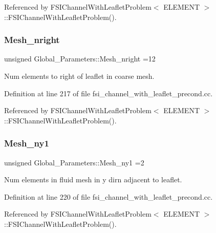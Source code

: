 Referenced by F\+S\+I\+Channel\+With\+Leaflet\+Problem$<$ E\+L\+E\+M\+E\+N\+T $>$\+::\+F\+S\+I\+Channel\+With\+Leaflet\+Problem().

\mbox{\label{namespaceGlobal__Parameters_a83ca6bb6240a3f5ef2199a8646607dcf}} 
\subsubsection{\texorpdfstring{Mesh\+\_\+nright}{Mesh\_nright}}
{\footnotesize\ttfamily unsigned Global\+\_\+\+Parameters\+::\+Mesh\+\_\+nright =12}



Num elements to right of leaflet in coarse mesh. 



Definition at line 217 of file fsi\+\_\+channel\+\_\+with\+\_\+leaflet\+\_\+precond.\+cc.



Referenced by F\+S\+I\+Channel\+With\+Leaflet\+Problem$<$ E\+L\+E\+M\+E\+N\+T $>$\+::\+F\+S\+I\+Channel\+With\+Leaflet\+Problem().

\mbox{\label{namespaceGlobal__Parameters_a77f2f492d44897203cceb4cbadef7aba}} 
\subsubsection{\texorpdfstring{Mesh\+\_\+ny1}{Mesh\_ny1}}
{\footnotesize\ttfamily unsigned Global\+\_\+\+Parameters\+::\+Mesh\+\_\+ny1 =2}



Num elements in fluid mesh in y dirn adjacent to leaflet. 



Definition at line 220 of file fsi\+\_\+channel\+\_\+with\+\_\+leaflet\+\_\+precond.\+cc.



Referenced by F\+S\+I\+Channel\+With\+Leaflet\+Problem$<$ E\+L\+E\+M\+E\+N\+T $>$\+::\+F\+S\+I\+Channel\+With\+Leaflet\+Problem().

\mbox{\label{namespaceGlobal__Parameters_ab0c1b5c0070b43a56ef64b106b6e2930}} 
